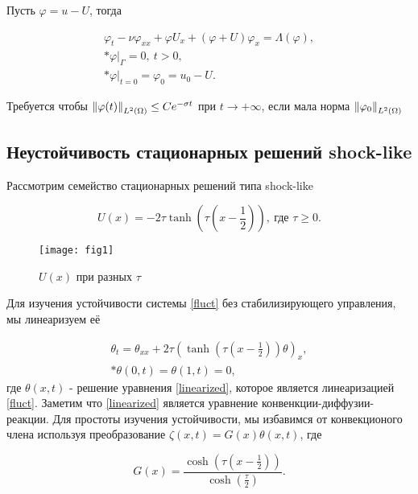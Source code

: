 Пусть $\varphi = u - U$, тогда

\begin{gather}\label{fluct}
    \varphi_t - \nu \varphi_{xx} + \varphi U_x + (\varphi + U)\varphi_x =
    \Lambda(\varphi),\\* 
    \varphi|_{\Gamma} = 0, \ t > 0,\\*
    \varphi|_{t = 0} = \varphi_0 = u_0 - U.
\end{gather}

Требуется чтобы $\left\lVert\varphi(t)\right\rVert_{L^2(\Omega)} \le C e^{-\sigma t}$ при $t \to
+\infty$, если мала норма $\left\lVert\varphi_0\right\rVert_{L^2(\Omega)}$

\subsection{Неустойчивость стационарных решений shock-like}
\vspace{1em}

Рассмотрим семейство стационарных решений типа shock-like \cite{KMV}

\begin{equation}\label{shock_like}
    U(x) = -2\tau\tanh{(\tau(x - \frac{1}{2}))}, \ \text{где } \tau \ge 0.
\end{equation}

\begin{figure}[H]
    \centering
    \texttt{[image: fig1]}
    \caption{$U(x)$ при разных $\tau$}
\end{figure}

Для изучения устойчивости системы \eqref{fluct} без стабилизирующего управления, 
мы линеаризуем её

\begin{gather}\label{linearized}
    \theta_t = \theta_{xx} + 2 \tau (\tanh(\tau(x - \frac{1}{2}))\theta)_x, \\*
    \theta(0, t) = \theta(1, t) = 0,
\end{gather}
где $\theta(x, t)$ - решение уравнения \eqref{linearized}, которое является
линеаризацией \eqref{fluct}. Заметим что \eqref{linearized} является  уравнение 
конвенкции-диффузии-реакции. Для простоты изучения устойчивости, мы избавимся 
от конвекционого члена используя преобразование 
$\zeta(x, t) = G(x)\theta(x, t)$, где 

\begin{equation}
    G(x) = \frac{\cosh(\tau(x - \frac{1}{2}))}{\cosh(\frac{\tau}{2})}.
\end{equation} 

